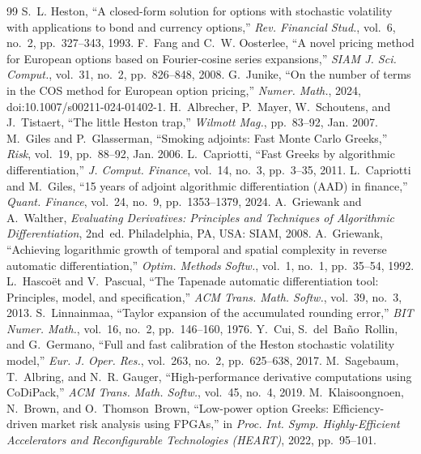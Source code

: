 \documentclass[conference]{IEEEtran}
\begin{document}
\begin{thebibliography}{99}
 S.~L. Heston, ``A closed-form solution for options with stochastic volatility with applications to bond and currency options,'' \emph{Rev. Financial Stud.}, vol.~6, no.~2, pp.~327--343, 1993.
 F.~Fang and C.~W. Oosterlee, ``A novel pricing method for European options based on Fourier-cosine series expansions,'' \emph{SIAM J. Sci. Comput.}, vol.~31, no.~2, pp.~826--848, 2008.
 G.~Junike, ``On the number of terms in the COS method for European option pricing,'' \emph{Numer. Math.}, 2024, doi:10.1007/s00211-024-01402-1.
 H.~Albrecher, P.~Mayer, W.~Schoutens, and J.~Tistaert, ``The little Heston trap,'' \emph{Wilmott Mag.}, pp.~83--92, Jan. 2007.
 M.~Giles and P.~Glasserman, ``Smoking adjoints: Fast Monte Carlo Greeks,'' \emph{Risk}, vol.~19, pp.~88--92, Jan. 2006.
 L.~Capriotti, ``Fast Greeks by algorithmic differentiation,'' \emph{J. Comput. Finance}, vol.~14, no.~3, pp.~3--35, 2011.
 L.~Capriotti and M.~Giles, ``15 years of adjoint algorithmic differentiation (AAD) in finance,'' \emph{Quant. Finance}, vol.~24, no.~9, pp.~1353--1379, 2024.
 A.~Griewank and A.~Walther, \emph{Evaluating Derivatives: Principles and Techniques of Algorithmic Differentiation}, 2nd~ed. Philadelphia, PA, USA: SIAM, 2008.
 A.~Griewank, ``Achieving logarithmic growth of temporal and spatial complexity in reverse automatic differentiation,'' \emph{Optim. Methods Softw.}, vol.~1, no.~1, pp.~35--54, 1992.
 L.~Hasco\"et and V.~Pascual, ``The Tapenade automatic differentiation tool: Principles, model, and specification,'' \emph{ACM Trans. Math. Softw.}, vol.~39, no.~3, 2013.
 S.~Linnainmaa, ``Taylor expansion of the accumulated rounding error,'' \emph{BIT Numer. Math.}, vol.~16, no.~2, pp.~146--160, 1976.
 Y.~Cui, S.~del~Ba\~no~Rollin, and G.~Germano, ``Full and fast calibration of the Heston stochastic volatility model,'' \emph{Eur. J. Oper. Res.}, vol.~263, no.~2, pp.~625--638, 2017.
 M.~Sagebaum, T.~Albring, and N.~R. Gauger, ``High-performance derivative computations using CoDiPack,'' \emph{ACM Trans. Math. Softw.}, vol.~45, no.~4, 2019.
 M.~Klaisoongnoen, N.~Brown, and O.~Thomson~Brown, ``Low-power option Greeks: Efficiency-driven market risk analysis using FPGAs,'' in \emph{Proc. Int. Symp. Highly-Efficient Accelerators and Reconfigurable Technologies (HEART)}, 2022, pp.~95--101.

\end{thebibliography}
\end{document}
